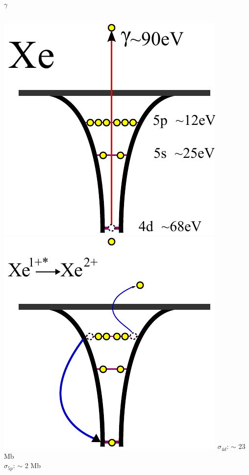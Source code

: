 \documentclass{beamer}
\begin{document}
\begin{frame}{$\gamma$}
\begin{columns}[t]
    \includegraphics[width=\textwidth]{figures/appendix/photo_ionization_Xe_4d}
    \includegraphics[width=\textwidth]{figures/appendix/photo_ionization_Xe_4d_Auger}
    $\sigma_{4d}$: $\sim$ 23 Mb\\
    $\sigma_{5p}$: $\sim$ 2 Mb
\end{columns}
\end{frame}
\end{document}
